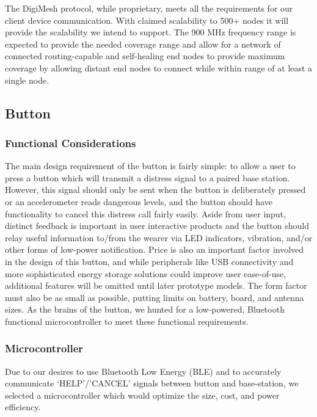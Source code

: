 \documentclass[journal,compsoc]{IEEEtran}
\begin{document}
The DigiMesh protocol, while proprietary, meets all the requirements for our client device communication.  With claimed scalability to 500+ nodes it will provide the scalability we intend to support.  The 900 MHz frequency range is expected to provide the needed coverage range and allow for a network of connected routing-capable and self-healing end nodes to provide maximum coverage  by allowing distant end nodes to connect while within range of at least a single node.

\subsection{Button}

\subsubsection{Functional Considerations}

The main design requirement of the button is fairly simple: to allow a user to press a button which will transmit a distress signal to a paired base station.  However, this signal should only be sent when the button is deliberately pressed or an accelerometer reads dangerous levels, and the button should have functionality to cancel this distress call fairly easily.  Aside from user input, distinct feedback is important in user interactive products and the button should relay useful information to/from the wearer via LED indicators, vibration, and/or other forms of low-power notification.  Price is also an important factor involved in the design of this button, and while peripherals like USB connectivity and more sophisticated energy storage solutions could improve user ease-of-use, additional features will be omitted until later prototype models.  The form factor must also be as small as possible, putting limits on battery, board, and antenna sizes.  As the brains of the button, we hunted for a low-powered, Bluetooth functional microcontroller to meet these functional requirements.

\subsubsection{Microcontroller}

Due to our desires to use Bluetooth Low Energy (BLE) and to accurately communicate ‘HELP’/’CANCEL’ signals between button and base-station, we selected a microcontroller which would optimize the size, cost, and power efficiency.
\end{document}

